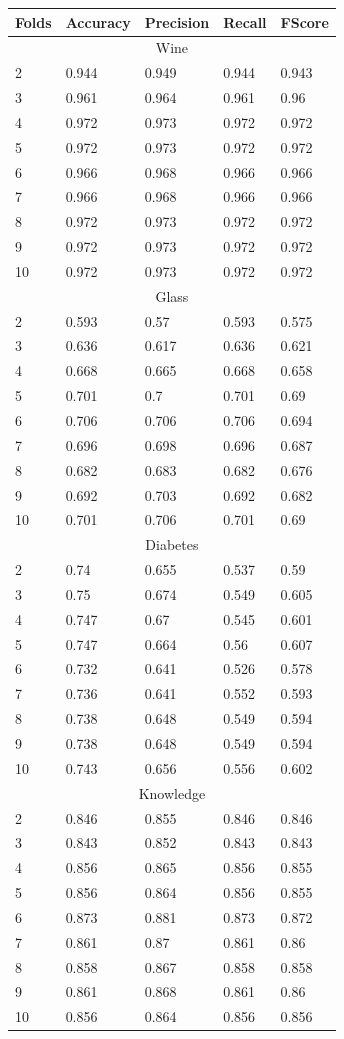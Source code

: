 \documentclass[12pt,a4paper]{article}
\begin{document}
\begin{tabular}{ |p{2.5cm}||p{2.5cm}|p{2.5cm}|p{2.5cm}|p{2.5cm}| }
\hline
Folds & Accuracy & Precision & Recall & FScore \\
\hline
\hline
\multicolumn{5}{|c|}{Wine}\\
\hline
2 & 0.944 & 0.949 & 0.944 & 0.943\\
3 & 0.961 & 0.964 & 0.961 & 0.96\\
4 & 0.972 & 0.973 & 0.972 & 0.972\\
5 & 0.972 & 0.973 & 0.972 & 0.972\\
6 & 0.966 & 0.968 & 0.966 & 0.966\\
7 & 0.966 & 0.968 & 0.966 & 0.966\\
8 & 0.972 & 0.973 & 0.972 & 0.972\\
9 & 0.972 & 0.973 & 0.972 & 0.972\\
10 & 0.972 & 0.973 & 0.972 & 0.972\\
\hline
\multicolumn{5}{|c|}{Glass}\\
\hline
2 & 0.593 & 0.57 & 0.593 & 0.575\\
3 & 0.636 & 0.617 & 0.636 & 0.621\\
4 & 0.668 & 0.665 & 0.668 & 0.658\\
5 & 0.701 & 0.7 & 0.701 & 0.69\\
6 & 0.706 & 0.706 & 0.706 & 0.694\\
7 & 0.696 & 0.698 & 0.696 & 0.687\\
8 & 0.682 & 0.683 & 0.682 & 0.676\\
9 & 0.692 & 0.703 & 0.692 & 0.682\\
10 & 0.701 & 0.706 & 0.701 & 0.69\\
\hline
\multicolumn{5}{|c|}{Diabetes}\\
\hline
2 & 0.74 & 0.655 & 0.537 & 0.59\\
3 & 0.75 & 0.674 & 0.549 & 0.605\\
4 & 0.747 & 0.67 & 0.545 & 0.601\\
5 & 0.747 & 0.664 & 0.56 & 0.607\\
6 & 0.732 & 0.641 & 0.526 & 0.578\\
7 & 0.736 & 0.641 & 0.552 & 0.593\\
8 & 0.738 & 0.648 & 0.549 & 0.594\\
9 & 0.738 & 0.648 & 0.549 & 0.594\\
10 & 0.743 & 0.656 & 0.556 & 0.602\\
\hline
\multicolumn{5}{|c|}{Knowledge}\\
\hline
2 & 0.846 & 0.855 & 0.846 & 0.846\\
3 & 0.843 & 0.852 & 0.843 & 0.843\\
4 & 0.856 & 0.865 & 0.856 & 0.855\\
5 & 0.856 & 0.864 & 0.856 & 0.855\\
6 & 0.873 & 0.881 & 0.873 & 0.872\\
7 & 0.861 & 0.87 & 0.861 & 0.86\\
8 & 0.858 & 0.867 & 0.858 & 0.858\\
9 & 0.861 & 0.868 & 0.861 & 0.86\\
10 & 0.856 & 0.864 & 0.856 & 0.856\\
\hline
\end{tabular}
\end{document}
